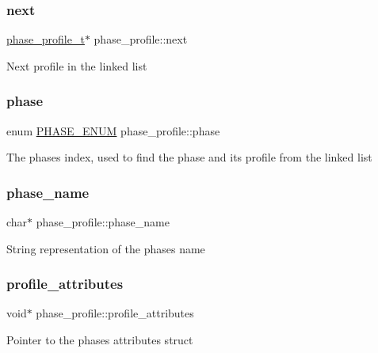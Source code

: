\subsubsection{\texorpdfstring{next}{next}}
{\footnotesize\ttfamily \hyperlink{AI__gov__phases_8h_a7512cecbb646499da7b0bec7c4155808}{phase\+\_\+profile\+\_\+t}$\ast$ phase\+\_\+profile\+::next}

Next profile in the linked list \mbox{\label{structphase__profile_a51cbd5f8e428ffd04e5a0feaf2f8caa9}} 
\subsubsection{\texorpdfstring{phase}{phase}}
{\footnotesize\ttfamily enum \hyperlink{AI__gov__phases_8h_a59664fef4d2987410ea13b917756d6ac}{P\+H\+A\+S\+E\+\_\+\+E\+N\+UM} phase\+\_\+profile\+::phase}

The phase\textquotesingle{}s index, used to find the phase and its profile from the linked list \mbox{\label{structphase__profile_a92a3f2bbc73f54e27255ad67660bcd89}} 
\subsubsection{\texorpdfstring{phase\+\_\+name}{phase\_name}}
{\footnotesize\ttfamily char$\ast$ phase\+\_\+profile\+::phase\+\_\+name}

String representation of the phase\textquotesingle{}s name \mbox{\label{structphase__profile_a0c77f4be0f8286275e0bf6583b1d5c20}} 
\subsubsection{\texorpdfstring{profile\+\_\+attributes}{profile\_attributes}}
{\footnotesize\ttfamily void$\ast$ phase\+\_\+profile\+::profile\+\_\+attributes}

Pointer to the phase\textquotesingle{}s attributes struct \mbox{\label{structphase__profile_ae6cf7a65756ec70cd7a50e3367af5eeb}} 
